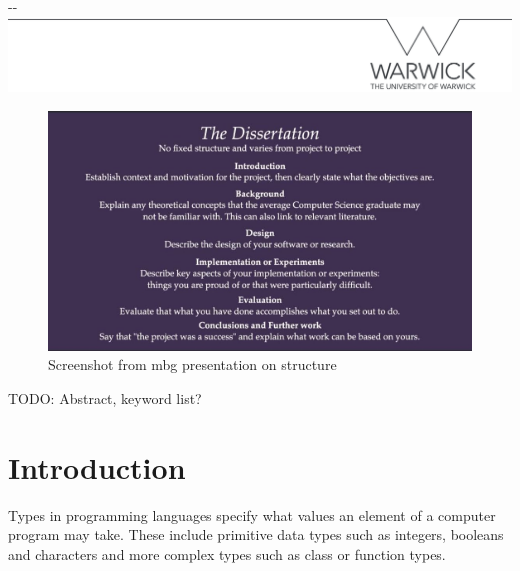 \documentclass[a4paper,fleqn,12pt]{article}
\begin{document}
\makeatletter
\begin{titlepage}

\LARGE \@title \\
\Large \\[1.5cm]

\vfill 

\begin{adjustwidth}{-\oddsidemargin-1in}{-\rightmargin}
  \centering
  \includegraphics[width=\paperwidth]{line.png}
\end{adjustwidth}

\vspace*{-3.5cm}

\end{titlepage}
\makeatother

\pagestyle{plain}

\begin{figure}[h!]
  \centering
  \includegraphics[width=1.000\linewidth]{images/image4.jpg}
  \caption{Screenshot from mbg presentation on structure}
\end{figure}

TODO: Abstract, keyword list?

\section{Introduction}\label{id:h.6k9gcmunzldy}

Types in programming languages specify what values an element of a computer program may take. These include primitive data types such as integers, booleans and characters and more complex types such as class or function types.
\end{document}
